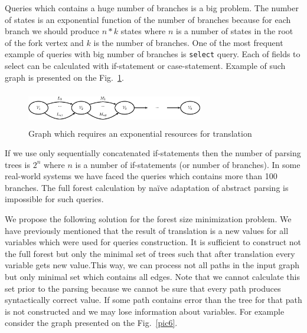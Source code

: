 Queries which contains a huge number of branches is a big problem. The number of states is an 
exponential function of the number of branches because for each branch we should produce $n*k$ 
states where $n$ is a number of states in the root of the fork vertex and $k$ is the number 
of branches. One of the most frequent example of queries with big number of branches 
is \verb|select| query. Each of fields to select can be calculated with if-statement 
or case-statement. Example of such graph is presented on the Fig.~\ref{pic5}.

\begin{figure}
    \begin{center}
        \includegraphics[width=7.7cm,height=1.5cm]{graphs/big_res.eps}
        \caption{Graph which requires an exponential resources for translation}
        \label{pic5}
    \end{center}
\end{figure}

If we use only sequentially concatenated if-statements then the number of parsing trees is $2^n$ 
where $n$ is a number of if-statements (or number of branches). In some real-world systems we 
have faced the queries which contains more than 100 branches. The full forest calculation by na\"ive 
adaptation of abstract parsing is impossible for such queries. 



We propose the following solution for the forest size minimization problem. We have previously mentioned 
that the result of translation is a new values for all variables which were used for queries construction. 
It is sufficient to construct not the full forest but only the minimal set of trees such that after 
translation every variable gets new value.This way, we can process not all paths in the input graph 
but only minimal set which contains all edges. Note that we cannot calculate this set prior to the parsing 
because we cannot be sure that every path produces syntactically correct value. If some path contains 
error than the tree for that path is not constructed and we may lose information about variables. 
For example consider the graph presented on the Fig.~\ref{pic6}.

